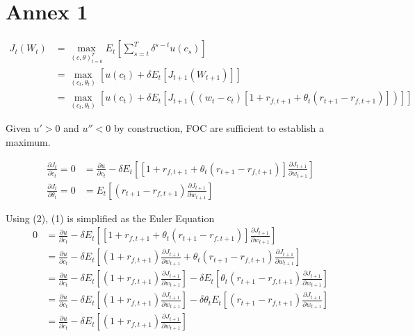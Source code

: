 \documentclass[]{article}
\begin{document}
\section{Annex 1}
\begin{align*}
	J_t(W_t) &= \max_{(c, \theta)_{t=0}^T} E_t \left[\sum_{s=t}^{T} \delta^{s-t}u(c_s)\right]\\
	&= \max_{(c_t, \theta_t)} \left[u(c_t) + \delta E_t\left[J_{t+1}(W_{t+1})\right]\right]\\
	&= \max_{(c_t, \theta_t)} \left[u(c_t) + \delta E_t\left[J_{t+1}((w_t - c_t) \left[1 + r_{f,t+1} + \theta_t(r_{t+1}-r_{f, t+1}) \right])\right]\right]
\end{align*}

Given $u'>0$ and $u''<0$ by construction, FOC are sufficient to establish a maximum.

\begin{align}
	\frac{\partial J_t}{\partial c_t} = 0 &= \frac{\partial u}{\partial c_t} - \delta E_t \left[\left[1 + r_{f,t+1} + \theta_t(r_{t+1}-r_{f, t+1}) \right]\frac{\partial J_{t+1}}{\partial w_{t+1}}\right]\\
	\frac{\partial J_t}{\partial \theta_t} = 0 &= E_t \left[(r_{t+1}-r_{f, t+1}) \frac{\partial J_{t+1}}{\partial w_{t+1}} \right]
\end{align}

Using (2), (1) is simplified as the Euler Equation
\begin{align*}
	0 &= \frac{\partial u}{\partial c_t} - \delta E_t \left[\left[1 + r_{f,t+1} + \theta_t(r_{t+1}-r_{f, t+1}) \right]\frac{\partial J_{t+1}}{\partial w_{t+1}}\right]\\
	&= \frac{\partial u}{\partial c_t} - \delta E_t \left[(1 + r_{f,t+1}) \frac{\partial J_{t+1}}{\partial w_{t+1}} + \theta_t(r_{t+1}-r_{f, t+1}) \frac{\partial J_{t+1}}{\partial w_{t+1}}\right] \\
	&= \frac{\partial u}{\partial c_t} - \delta E_t \left[(1 + r_{f,t+1})\frac{\partial J_{t+1}}{\partial w_{t+1}} \right] - \delta E_t \left[ \theta_t(r_{t+1}-r_{f, t+1}) \frac{\partial J_{t+1}}{\partial w_{t+1}}\right] \\
	&= \frac{\partial u}{\partial c_t} - \delta E_t \left[(1 + r_{f,t+1})\frac{\partial J_{t+1}}{\partial w_{t+1}} \right] - \delta \theta_t E_t \left[(r_{t+1}-r_{f, t+1}) \frac{\partial J_{t+1}}{\partial w_{t+1}}\right] \\
	&= \frac{\partial u}{\partial c_t} - \delta E_t \left[(1 + r_{f,t+1})\frac{\partial J_{t+1}}{\partial w_{t+1}} \right]
\end{align*}
\end{document}
